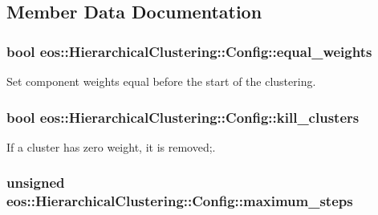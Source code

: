 \subsection{Member Data Documentation}
\hypertarget{classeos_1_1HierarchicalClustering_1_1Config_afb6c81886f8c7fc9618cc469b51dfd91}{
\subsubsection[{equal\_\-weights}]{\setlength{\rightskip}{0pt plus 5cm}bool {\bf eos::HierarchicalClustering::Config::equal\_\-weights}}}
\label{classeos_1_1HierarchicalClustering_1_1Config_afb6c81886f8c7fc9618cc469b51dfd91}


Set component weights equal before the start of the clustering. \hypertarget{classeos_1_1HierarchicalClustering_1_1Config_aef80452710fbd5dfab29150cd26790ee}{
\subsubsection[{kill\_\-clusters}]{\setlength{\rightskip}{0pt plus 5cm}bool {\bf eos::HierarchicalClustering::Config::kill\_\-clusters}}}
\label{classeos_1_1HierarchicalClustering_1_1Config_aef80452710fbd5dfab29150cd26790ee}


If a cluster has zero weight, it is removed;. \hypertarget{classeos_1_1HierarchicalClustering_1_1Config_af5c0aa9ab025297407497a246ac613ee}{
\subsubsection[{maximum\_\-steps}]{\setlength{\rightskip}{0pt plus 5cm}unsigned {\bf eos::HierarchicalClustering::Config::maximum\_\-steps}}}
\label{classeos_1_1HierarchicalClustering_1_1Config_af5c0aa9ab025297407497a246ac613ee}


